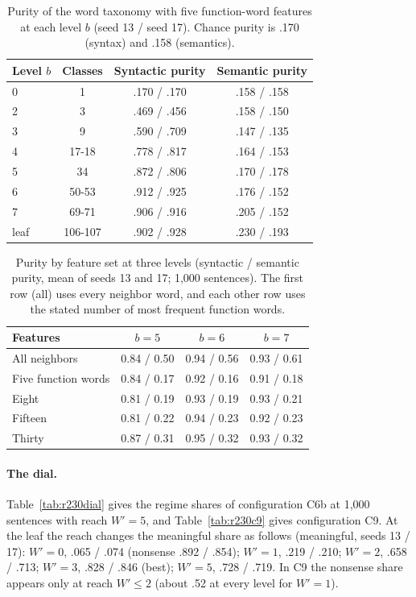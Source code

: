 \documentclass[11pt,letterpaper]{article}
\begin{document}
\begin{table}[h]
\caption{Purity of the word taxonomy with five function-word features at each level $b$ (seed 13 / seed 17). Chance purity is .170 (syntax) and .158 (semantics).}
\label{tab:r230purity}
\begin{center}
\small
\begin{tabular}{lccc}
\toprule
Level $b$ & Classes & Syntactic purity & Semantic purity \\
\midrule
$0$ & 1 & .170 / .170 & .158 / .158 \\
2 & 3 & .469 / .456 & .158 / .150 \\
3 & 9 & .590 / .709 & .147 / .135 \\
4 & 17-18 & .778 / .817 & .164 / .153 \\
5 & 34 & .872 / .806 & .170 / .178 \\
6 & 50-53 & .912 / .925 & .176 / .152 \\
7 & 69-71 & .906 / .916 & .205 / .152 \\
leaf & 106-107 & .902 / .928 & .230 / .193 \\
\bottomrule
\end{tabular}
\end{center}
\end{table}

\begin{table}[h]
\caption{Purity by feature set at three levels (syntactic / semantic purity, mean of seeds 13 and 17; 1,000 sentences). The first row (all) uses every neighbor word, and each other row uses the stated number of most frequent function words.}
\label{tab:r230feat}
\begin{center}
\small
\begin{tabular}{lccc}
\toprule
Features & $b=5$ & $b=6$ & $b=7$ \\
\midrule
All neighbors & 0.84 / 0.50 & 0.94 / 0.56 & 0.93 / 0.61 \\
Five function words & 0.84 / 0.17 & 0.92 / 0.16 & 0.91 / 0.18 \\
Eight & 0.81 / 0.19 & 0.93 / 0.19 & 0.93 / 0.21 \\
Fifteen & 0.81 / 0.22 & 0.94 / 0.23 & 0.92 / 0.23 \\
Thirty & 0.87 / 0.31 & 0.95 / 0.32 & 0.93 / 0.32 \\
\bottomrule
\end{tabular}
\end{center}
\end{table}

\paragraph{The dial.} Table~\ref{tab:r230dial} gives the regime shares of configuration C6b at 1,000 sentences with reach $W'=5$, and Table~\ref{tab:r230c9} gives configuration C9.
At the leaf the reach changes the meaningful share as follows (meaningful, seeds 13 / 17): $W'=0$, .065 / .074 (nonsense .892 / .854); $W'=1$, .219 / .210; $W'=2$, .658 / .713; $W'=3$, .828 / .846 (best); $W'=5$, .728 / .719.
In C9 the nonsense share appears only at reach $W'\le 2$ (about .52 at every level for $W'=1$).
\end{document}
